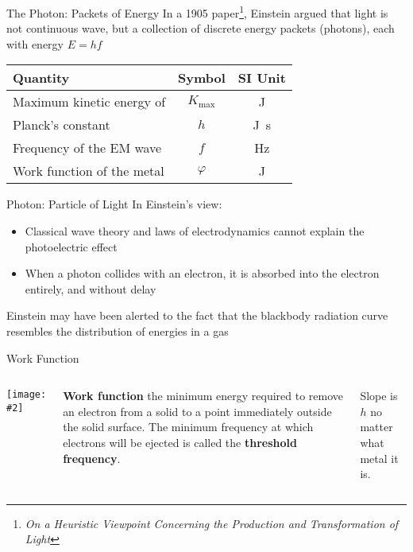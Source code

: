 \documentclass[12pt,compress,aspectratio=169]{beamer}
\newcommand{\pic}[2]{\texttt{[image: \#2]}}
\newcommand{\eq}[2]{\vspace{#1}{\Large\begin{displaymath}#2\end{displaymath}}}
\begin{document}
\begin{frame}{The Photon: Packets of Energy}
  In a 1905 paper\footnote{\emph{On a Heuristic Viewpoint Concerning the
      Production and Transformation of Light}}, Einstein argued that light is
  not continuous wave, but a collection of discrete energy packets (photons),
  each with energy $E=hf$

  \eq{-.22in}{
    \boxed{K_\text{max}=
      \begin{cases}
        hf-\varphi & \text{if }hf>\varphi\\
        0          & \text{otherwise}
      \end{cases}
    }
  }
  \begin{center}
    \begin{tabular}{l|c|c}
      \rowcolor{pink}
      \textbf{Quantity} & \textbf{Symbol} & \textbf{SI Unit} \\ \hline
      Maximum kinetic energy of   & $K_\text{max}$ & \si{\joule}\\
      Planck's constant           & $h$   & \si{\joule.\second}\\
      Frequency of the EM wave    & $f$   & \si{\hertz}\\
      Work function of the metal  & $\varphi$ & \si{\joule}
    \end{tabular}
  \end{center}
\end{frame}



\begin{frame}{Photon: Particle of Light}
  In Einstein's view:
  \begin{itemize}
  \item Classical wave theory and laws of electrodynamics cannot explain the
    photoelectric effect
  \item When a photon collides with an electron, it is absorbed into the
    electron entirely, and without delay
  \end{itemize}
  Einstein may have been alerted to the fact that the blackbody radiation curve
  resembles the distribution of energies in a gas
\end{frame}



\begin{frame}{Work Function}
  \begin{columns}
  \pic{1}{550px-Photoelectric_effect_diagram}
  
  \textbf{Work function} the minimum energy required to remove an electron
  from a solid to a point immediately outside the solid surface. The minimum
  frequency at which electrons will be ejected is called the
  \textbf{threshold frequency}.

  \vspace{.15in}Slope is $h$ no matter what metal it is.
  \end{columns}
\end{frame}
\end{document}
